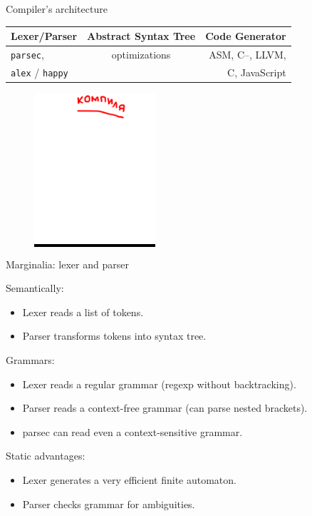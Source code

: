 \documentclass[handout]{beamer}
\begin{document}
\begin{frame}{Compiler's architecture}

\begin{tabular}{l@{~~~$\to$~~~}c@{~~~$\to$~~~}r}
Lexer/Parser &
Abstract Syntax Tree &
Code Generator \\ \hline
{\tt parsec}, &
optimizations &
ASM, C--, LLVM, \\
{\tt alex} / {\tt happy} &
&
C, JavaScript
\end{tabular}

\begin{figure}[H]
\centering
\colorbox{black}{
\includegraphics[width=0.4\textwidth]{plan.png}
}
\end{figure}

\end{frame}

\begin{frame}{Marginalia: lexer and parser}

Semantically:
\begin{itemize}
\item Lexer reads a list of tokens.
\item Parser transforms tokens into syntax tree.
\end{itemize}

Grammars:
\begin{itemize}
\item Lexer reads a regular grammar (regexp without backtracking).
\item Parser reads a context-free grammar (can parse nested brackets).
\item parsec can read even a context-sensitive grammar.
\end{itemize}

Static advantages:
\begin{itemize}
\item Lexer generates a very efficient finite automaton.
\item Parser checks grammar for ambiguities.
\end{itemize}

\end{frame}
\end{document}
